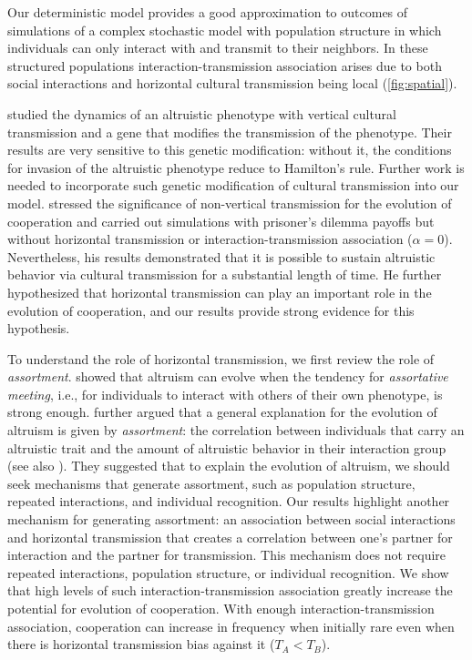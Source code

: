\documentclass[12pt]{extarticle}
\begin{document}
Our deterministic model provides a good approximation to outcomes of simulations of a complex stochastic model with population structure in which individuals can only interact with and transmit to their neighbors.
In these structured populations interaction-transmission association arises due to both social interactions and horizontal cultural transmission being local (\autoref{fig:spatial}).

\citet{feldman1985gene} studied the dynamics of an altruistic phenotype with vertical cultural transmission and a gene that modifies the transmission of the phenotype. Their results are very sensitive to this genetic modification: without it, the conditions for invasion of the altruistic phenotype reduce to Hamilton's rule.
Further work is needed to incorporate such genetic modification of cultural transmission into our model.
\citet{woodcock2006significance} stressed the significance of non-vertical transmission for the evolution of cooperation and
carried out simulations with prisoner's dilemma payoffs but without horizontal transmission or interaction-transmission association ($\alpha=0$).
Nevertheless, his results demonstrated that it is possible to sustain altruistic behavior via cultural transmission for a substantial length of time.
He further hypothesized that horizontal transmission can play an important role in the evolution of cooperation, and our results provide strong evidence for this hypothesis. 

To understand the role of horizontal transmission, we first review the role of \emph{assortment}.
\citet{Eshel1982} showed that altruism can evolve when the tendency for \emph{assortative meeting}, i.e., for individuals to interact with others of their own phenotype, is strong enough.
\citet{Fletcher2009assortment}  further argued that a general explanation for the evolution of altruism is given by \emph{assortment}: the correlation between individuals that carry an altruistic trait and the amount of altruistic behavior in their interaction group (see also \citet{Bijma2010assortment}).
They suggested that to explain the evolution of altruism, we should seek mechanisms that generate  assortment, such as population structure, repeated interactions, and individual recognition.
Our results highlight another mechanism for generating assortment: an association between social interactions and horizontal transmission that creates a correlation between one's partner for interaction and the partner for transmission.
This mechanism does not require repeated interactions, population structure, or individual recognition.
We show that high levels of such interaction-transmission association greatly increase the potential for evolution of cooperation.
With enough interaction-transmission association, cooperation can increase in frequency when initially rare even when there is horizontal transmission bias against it ($T_A<T_B$).
\end{document}
